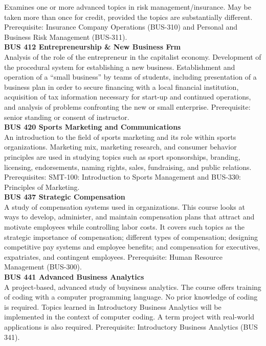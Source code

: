 \documentclass[
  letterpaper,
]{scrbook}
\begin{document}
Examines one or more advanced topics in risk management/insurance. May
be taken more than once for credit, provided the topics are
substantially different. Prerequisite: Insurance Company Operations
(BUS-310) and Personal and Business Risk Management (BUS-311).\\
\textbf{BUS 412 Entrepreneurship \& New Business Frm}\\
Analysis of the role of the entrepreneur in the capitalist economy.
Development of the procedural system for establishing a new business.
Establishment and operation of a ``small business'' by teams of
students, including presentation of a business plan in order to secure
financing with a local financial institution, acquisition of tax
information necessary for start-up and continued operations, and
analysis of problems confronting the new or small enterprise.
Prerequisite: senior standing or consent of instructor.\\
\textbf{BUS 420 Sports Marketing and Communications}\\
An introduction to the field of sports marketing and its role within
sports organizations. Marketing mix, marketing research, and consumer
behavior principles are used in studying topics such as sport
sponsorships, branding, licensing, endorsements, naming rights, sales,
fundraising, and public relations. Prerequisites: SMT-100: Introduction
to Sports Management and BUS-330: Principles of Marketing.\\
\textbf{BUS 437 Strategic Compensation}\\
A study of compensation systems used in organizations. This course looks
at ways to develop, administer, and maintain compensation plans that
attract and motivate employees while controlling labor costs. It covers
such topics as the strategic importance of compensation; different types
of compensation; designing competitive pay systems and employee
benefits; and compensation for executives, expatriates, and contingent
employees. Prerequisite: Human Resource Management (BUS-300).\\
\textbf{BUS 441 Advanced Business Analytics}\\
A project-based, advanced study of buysiness analytics. The course
offers training of coding with a computer programming language. No prior
knowledge of coding is required. Topics learned in Introductory Business
Analytics will be implemented in the context of computer coding. A term
project with real-world applications is also required. Prerequisite:
Introductory Business Analytics (BUS 341).\\
\end{document}
